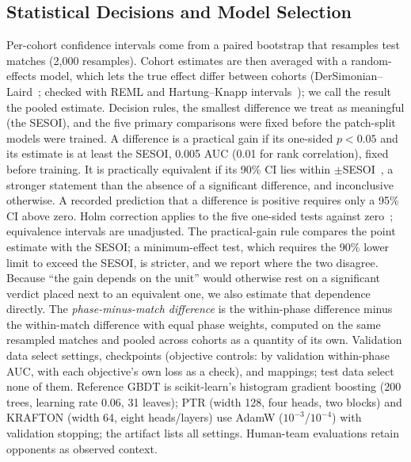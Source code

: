 \documentclass[sigconf,anonymous]{acmart}
\begin{document}
\subsection{Statistical Decisions and Model Selection}
Per-cohort confidence intervals come from a paired bootstrap that resamples test matches (2,000 resamples). Cohort estimates are then averaged with a random-effects model, which lets the true effect differ between cohorts (DerSimonian--Laird~\cite{DerSimonian86}; checked with REML and Hartung--Knapp intervals~\cite{HartungKnapp01}); we call the result the pooled estimate. Decision rules, the smallest difference we treat as meaningful (the SESOI), and the five primary comparisons were fixed before the patch-split models were trained. A difference is a practical gain if its one-sided $p<0.05$ and its estimate is at least the SESOI, 0.005 AUC (0.01 for rank correlation), fixed before training. It is practically equivalent if its 90\% CI lies within $\pm$SESOI~\cite{Schuirmann87}, a stronger statement than the absence of a significant difference, and inconclusive otherwise. A recorded prediction that a difference is positive requires only a 95\% CI above zero. Holm correction applies to the five one-sided tests against zero~\cite{Holm79}; equivalence intervals are unadjusted. The practical-gain rule compares the point estimate with the SESOI; a minimum-effect test, which requires the 90\% lower limit to exceed the SESOI, is stricter, and we report where the two disagree. Because ``the gain depends on the unit'' would otherwise rest on a significant verdict placed next to an equivalent one, we also estimate that dependence directly. The \emph{phase-minus-match difference} is the within-phase difference minus the within-match difference with equal phase weights, computed on the same resampled matches and pooled across cohorts as a quantity of its own. Validation data select settings, checkpoints (objective controls: by validation within-phase AUC, with each objective's own loss as a check), and mappings; test data select none of them. Reference GBDT is scikit-learn's histogram gradient boosting (200 trees, learning rate 0.06, 31 leaves); PTR (width 128, four heads, two blocks) and KRAFTON (width 64, eight heads/layers) use AdamW ($10^{-3}$/$10^{-4}$) with validation stopping; the artifact lists all settings. Human-team evaluations retain opponents as observed context.

\end{document}
